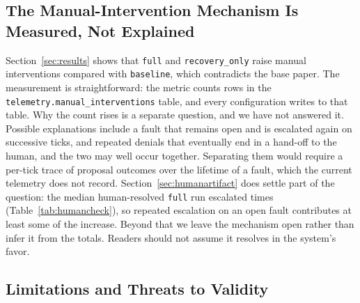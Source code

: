 \subsection{The Manual-Intervention Mechanism Is Measured, Not Explained}
Section~\ref{sec:results} shows that \texttt{full} and \texttt{recovery\_only} raise manual
interventions compared with \texttt{baseline}, which contradicts the base paper. The measurement is
straightforward: the metric counts rows in the
\texttt{telemetry.\allowbreak manual\_\allowbreak interventions} table, and every configuration writes
to that table. Why the count rises is a separate question, and we have not answered it. Possible explanations include a fault that remains open and is escalated again on successive ticks,
and repeated denials that eventually end in a hand-off to the human, and the two may well occur
together. Separating them would require a per-tick trace of proposal outcomes over the lifetime of a
fault, which the current telemetry does not record. Section~\ref{sec:humanartifact} does settle part
of the question: the median human-resolved \texttt{full} run escalated \NHumanEscalationsFull{} times
(Table~\ref{tab:humancheck}), so repeated escalation on an open fault contributes at least some of
the increase. Beyond that we leave the mechanism open rather than infer it from the totals. Readers should not
assume it resolves in the
system's favor.

\subsection{Limitations and Threats to Validity}\label{sec:limitations}

